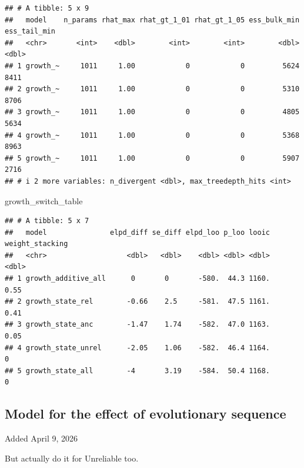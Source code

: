 \documentclass[
]{article}
\newenvironment{Shaded}{\begin{snugshade}}{\end{snugshade}}
\newcommand{\NormalTok}[1]{#1}
\begin{document}
\begin{verbatim}
## # A tibble: 5 x 9
##   model    n_params rhat_max rhat_gt_1_01 rhat_gt_1_05 ess_bulk_min ess_tail_min
##   <chr>       <int>    <dbl>        <int>        <int>        <dbl>        <dbl>
## 1 growth_~     1011     1.00            0            0         5624         8411
## 2 growth_~     1011     1.00            0            0         5310         8706
## 3 growth_~     1011     1.00            0            0         4805         5634
## 4 growth_~     1011     1.00            0            0         5368         8963
## 5 growth_~     1011     1.00            0            0         5907         2716
## # i 2 more variables: n_divergent <dbl>, max_treedepth_hits <int>
\end{verbatim}

\begin{Shaded}
\begin{Highlighting}[]
\NormalTok{growth\_switch\_table}
\end{Highlighting}
\end{Shaded}

\begin{verbatim}
## # A tibble: 5 x 7
##   model               elpd_diff se_diff elpd_loo p_loo looic weight_stacking
##   <chr>                   <dbl>   <dbl>    <dbl> <dbl> <dbl>           <dbl>
## 1 growth_additive_all      0       0       -580.  44.3 1160.            0.55
## 2 growth_state_rel        -0.66    2.5     -581.  47.5 1161.            0.41
## 3 growth_state_anc        -1.47    1.74    -582.  47.0 1163.            0.05
## 4 growth_state_unrel      -2.05    1.06    -582.  46.4 1164.            0   
## 5 growth_state_all        -4       3.19    -584.  50.4 1168.            0
\end{verbatim}

\subsection{Model for the effect of evolutionary
sequence}\label{model-for-the-effect-of-evolutionary-sequence}

Added April 9, 2026

But actually do it for Unreliable too.
\end{document}
